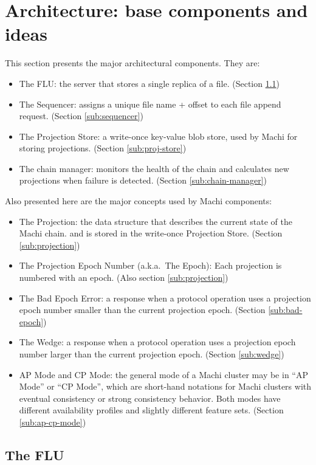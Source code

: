 \documentclass[preprint,10pt]{sigplanconf}
\begin{document}
\section{Architecture: base components and ideas}

This section presents the major architectural components.  They are:

\begin{itemize}
\item The FLU: the server that stores a single replica of a file.
(Section \ref{sub:flu})
\item The Sequencer: assigns a unique file name + offset to each file
  append request.
(Section \ref{sub:sequencer})
\item The Projection Store: a write-once key-value blob store, used by
  Machi for storing projections.
(Section \ref{sub:proj-store})
\item The chain manager: monitors the health of the
  chain and calculates new projections when failure is detected.
(Section \ref{sub:chain-manager})
\end{itemize}

Also presented here are the major concepts used by Machi components:
\begin{itemize}
\item The Projection: the data structure that describes the current
  state of the Machi chain.  
  and is stored in the write-once Projection Store.
(Section \ref{sub:projection})
\item The Projection Epoch Number (a.k.a.~The Epoch): Each projection
  is numbered with an epoch.
(Also section \ref{sub:projection})
\item The Bad Epoch Error: a response when a protocol operation uses a
  projection epoch number smaller than the current projection epoch.
(Section \ref{sub:bad-epoch})
\item The Wedge: a response when a protocol operation uses a
  projection epoch number larger than the current projection epoch.
(Section \ref{sub:wedge})
\item AP Mode and CP Mode: the general mode of a Machi cluster may be
  in ``AP Mode'' or ``CP Mode'', which are short-hand notations for
  Machi clusters with eventual consistency or strong consistency
  behavior.  Both modes have different availability profiles and
  slightly different feature sets.  (Section \ref{sub:ap-cp-mode})
\end{itemize}

\subsection{The FLU}
\label{sub:flu}
\end{document}
